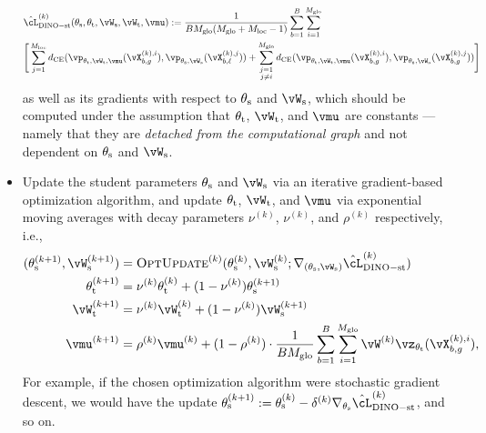 \documentclass[\toplevelprefix/book-main.tex]{subfiles}
\begin{document}
\begin{itemize}
    \begin{align}\label{eq:dino_loss_teacherstudent_empirical}
        &\hat{\cL}_{\dino{}-\student\teacher}^{(k)}(\theta_{\student}, \theta_{\teacher}, \vW_{\student}, \vW_{\teacher}, \vmu) :=
        \frac{1}{BM_{\glo}(M_{\glo} + M_{\loc} - 1)}\sum_{b = 1}^{B}\sum_{i = 1}^{M_{\glo}}\\
        &\Bigg[\sum_{j = 1}^{M_{\loc}}d_{\CE}(\vp_{\theta_{\teacher}, \vW_{\teacher}, \vmu}(\vX_{b, g}^{(k), i}), \vp_{\theta_{\student}, \vW_{\student}}(\vX_{b, \ell}^{(k), j})) + \sum_{\substack{j = 1 \\ j \neq i}}^{M_{\glo}}d_{\CE}(\vp_{\theta_{\teacher}, \vW_{\teacher}, \vmu}(\vX_{b, g}^{(k), i}), \vp_{\theta_{\student}, \vW_{\student}}(\vX_{b, g}^{(k), j}))\Bigg]\nonumber
    \end{align}
    as well as its gradients with respect to \(\theta_{\mathrm{s}}\) and \(\vW_{\student}\), which should be computed under the assumption that \(\theta_{\mathrm{t}}\), \(\vW_{\teacher}\), and \(\vmu\) are constants --- namely that they are \textit{detached from the computational graph} and not dependent on \(\theta_{\mathrm{s}}\) and \(\vW_{\student}\).
    \item Update the student parameters \(\theta_{\mathrm{s}}\) and \(\vW_{\student}\) via an iterative gradient-based optimization algorithm, and update \(\theta_{\mathrm{t}}\), \(\vW_{\teacher}\), and \(\vmu\) via exponential moving averages with decay parameters \(\nu^{(k)}\), \(\nu^{(k)}\), and \(\rho^{(k)}\) respectively, i.e., 
    \begin{align}
        (\theta_{\student}^{(k + 1)}, \vW_{\student}^{(k + 1)})
        &= \textsc{OptUpdate}^{(k)}(\theta_{\student}^{(k)}, \vW_{\student}^{(k)}; \nabla_{(\theta_{\student}, \vW_{\student})}\hat{\cL}_{\dino-\student\teacher}^{(k)}) \\
        \theta_{\teacher}^{(k + 1)}
        &= \nu^{(k)}\theta_{\teacher}^{(k)} + (1 - \nu^{(k)})\theta_{\student}^{(k + 1)} \\
        \vW_{\teacher}^{(k + 1)}
        &= \nu^{(k)}\vW_{\teacher}^{(k)} + (1 - \nu^{(k)})\vW_{\student}^{(k + 1)} \\
        \vmu^{(k + 1)}
        &= \rho^{(k)}\vmu^{(k)} + (1 - \rho^{(k)})\cdot\frac{1}{BM_{\glo}}\sum_{b = 1}^{B}\sum_{i = 1}^{M_{\glo}}\vW^{(k)}\vz_{\theta_{\teacher}}(\vX_{b, g}^{(k), i}),
    \end{align}
    For example, if the chosen optimization algorithm were stochastic gradient descent, we would have the update \(\theta_{\student}^{(k + 1)} := \theta_{\student}^{(k)} - \delta^{(k)}\nabla_{\theta_{\student}}\hat{\cL}_{\dino{}-\student\teacher}^{(k)}\), and so on.
\end{itemize}
\end{document}
